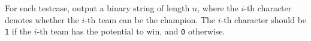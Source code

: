 For each testcase, output a binary string of length $n$, where the $i$-th character denotes whether the $i$-th team can be the champion.
The $i$-th character should be \texttt{1} if the $i$-th team has the potential to win, and \texttt{0} otherwise.